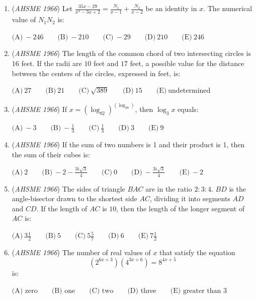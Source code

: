 \begin{enumerate}
 $\text{(A)} \ 3 \qquad \text{(B)} \ \frac {5\sqrt {2}}{2} \qquad \text{(C)} \frac {5\sqrt3}{2} \ \qquad \text{(D)} \ 3\sqrt3 \qquad \text{(E)} \ \text{none of these}$


	\item (\textit{AHSME 1966}) Let $\frac {35x - 29}{x^2 - 3x + 2} = \frac {N_1}{x - 1} + \frac {N_2}{x - 2}$ be an identity in $x$. The numerical value of $N_1N_2$ is:


 $\text{(A)} \ - 246 \qquad \text{(B)} \ - 210 \qquad \text{(C)} \ - 29 \qquad \text{(D)} \ 210 \qquad \text{(E)} \ 246$


	\item (\textit{AHSME 1966}) The length of the common chord of two intersecting circles is $16$ feet. If the radii are $10$ feet and $17$ feet, a possible value for the distance between the centers of the circles, expressed in feet, is:


 $\text{(A)} \ 27 \qquad \text{(B)} \ 21 \qquad \text{(C)} \ \sqrt {389} \qquad \text{(D)} \ 15 \qquad \text{(E)} \ \text{undetermined}$


	\item (\textit{AHSME 1966}) If $x = (\log_82)^{(\log_28)}$, then $\log_3x$ equals:


 $\text{(A)} \ - 3 \qquad \text{(B)} \ - \frac13 \qquad \text{(C)} \ \frac13 \qquad \text{(D)} \ 3 \qquad \text{(E)} \ 9$


	\item (\textit{AHSME 1966}) If the sum of two numbers is 1 and their product is 1, then the sum of their cubes is:


 $\text{(A)} \ 2 \qquad \text{(B)} \ - 2 - \frac {3i\sqrt {3}}{4} \qquad \text{(C)} \ 0 \qquad \text{(D)} \ - \frac {3i\sqrt {3}}{4} \qquad \text{(E)} \ - 2$


	\item (\textit{AHSME 1966}) The sides of triangle $BAC$ are in the ratio $2: 3: 4$. $BD$ is the angle-bisector drawn to the shortest side $AC$, dividing it into segments $AD$ and $CD$. If the length of $AC$ is $10$, then the length of the longer segment of $AC$ is:


 $\text{(A)} \ 3\frac12 \qquad \text{(B)} \ 5 \qquad \text{(C)} \ 5\frac57 \qquad \text{(D)} \ 6 \qquad \text{(E)} \ 7\frac12$


	\item (\textit{AHSME 1966}) The number of real values of $x$ that satisfy the equation 
 \[(2^{6x+3})(4^{3x+6})=8^{4x+5}\] is:


 $\text{(A)  zero} \qquad \text{(B)  one} \qquad \text{(C)  two} \qquad \text{(D)  three} \qquad \text{(E)  greater than 3}$



\end{enumerate}
